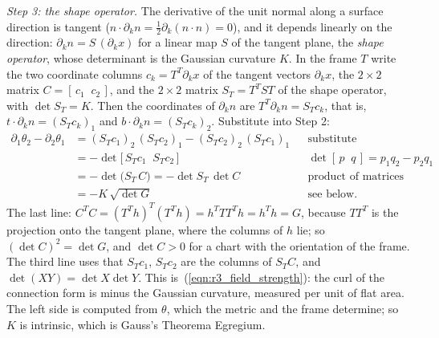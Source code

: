 \emph{Step 3: the shape operator.} The derivative of the unit normal along a surface direction is tangent ($n\cdot\partial_kn = \frac12\partial_k(n\cdot n) = 0$), and it depends linearly on the direction: $\partial_kn = S\,(\partial_kx)$ for a linear map $S$ of the tangent plane, the \emph{shape operator}, whose determinant is the Gaussian curvature $K$. In the frame $T$ write the two coordinate columns $c_k = T^T\partial_kx$ of the tangent vectors $\partial_kx$, the $2\times 2$ matrix $C = [\,c_1 \;\; c_2\,]$, and the $2\times 2$ matrix $S_T = T^TST$ of the shape operator, with $\det S_T = K$. Then the coordinates of $\partial_kn$ are $T^T\partial_kn = S_Tc_k$, that is, $t\cdot\partial_kn = (S_Tc_k)_1$ and $b\cdot\partial_kn = (S_Tc_k)_2$. Substitute into Step 2:
\begin{align*}
\partial_1\theta_2 - \partial_2\theta_1 &= (S_Tc_1)_2\,(S_Tc_2)_1 - (S_Tc_2)_2\,(S_Tc_1)_1 && \text{substitute} \\
&= -\det\big[\,S_Tc_1 \;\; S_Tc_2\,\big] && \det[\,p \;\; q\,] = p_1q_2 - p_2q_1 \\
&= -\det\big(S_T\,C\big) = -\det S_T\,\det C && \text{product of matrices} \\
&= -K\,\sqrt{\det G} && \text{see below.}
\end{align*}
The last line: $C^TC = (T^T h)^T(T^T h) = h^T TT^T h = h^Th = G$, because $TT^T$ is the projection onto the tangent plane, where the columns of $h$ lie; so $(\det C)^2 = \det G$, and $\det C > 0$ for a chart with the orientation of the frame. The third line uses that $S_Tc_1$, $S_Tc_2$ are the columns of $S_TC$, and $\det(XY) = \det X\det Y$. This is~(\ref{eqn:r3_field_strength}): the curl of the connection form is minus the Gaussian curvature, measured per unit of flat area. The left side is computed from $\theta$, which the metric and the frame determine; so $K$ is intrinsic, which is Gauss's Theorema Egregium.

